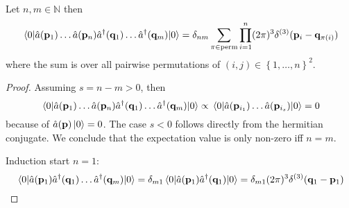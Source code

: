 \begin{lemma}\label{thm:anti_normal_expvalue}
	Let $n,m\in\mathbb{N}$ then
	\begin{equation}
		\expval{
			\hat{a}(\vb{p}_1)
			\dots
			\hat{a}(\vb{p}_n)
			\hat{a}^\dagger(\vb{q}_1)
			\dots
			\hat{a}^\dagger(\vb{q}_m)
		}{0}
		=
		\delta_{nm}
		\sum_{\pi\in\textrm{perm}}
		\prod^n_{i=1}
		(2\pi)^3
		\delta^{(3)}(\vb{p}_i-\vb{q}_{\pi(i)})
	\end{equation}
	where the sum is over all pairwise permutations of $(i,j)\in\left\{1,\dots,n\right\}^2$.
\end{lemma}
\begin{proof}
	Assuming $s=n-m>0$, then
	\begin{equation*}
		\expval{
			\hat{a}(\vb{p}_1)
			\dots
			\hat{a}(\vb{p}_n)
			\hat{a}^\dagger(\vb{q}_1)
			\dots
			\hat{a}^\dagger(\vb{q}_m)
		}{0}
		\propto
		\expval{
			\hat{a}(\vb{p}_{i_1})
			\dots
			\hat{a}(\vb{p}_{i_s})
		}{0}
		=
		0
	\end{equation*}
	because of $\hat{a}(\vb{p})\ket{0}=0$. The case $s<0$ follows directly from the hermitian conjugate.
	We conclude that the expectation value is only non-zero iff $n=m$.
	
	Induction start $n=1$:
	\begin{equation*}
		\expval{
			\hat{a}(\vb{p}_1)
			\hat{a}^\dagger(\vb{q}_1)
			\dots
			\hat{a}^\dagger(\vb{q}_m)
		}{0}
		=
		\delta_{m1}
		\expval{
			\hat{a}(\vb{p}_1)
			\hat{a}^\dagger(\vb{q}_1)
		}{0}
		=
		\delta_{m1}
		(2\pi)^3
		\delta^{(3)}(\vb{q}_1-\vb{p}_1)
	\end{equation*}
	

\end{proof}
